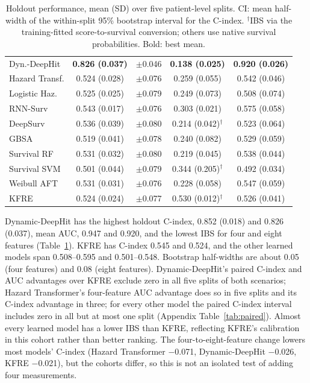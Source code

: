\begin{table}[t]
{\begin{tabular}{@{}lcccc@{}}
Dyn.-DeepHit & \textbf{0.826 (0.037)} & $\pm$0.046 & \textbf{0.138 (0.025)} & \textbf{0.920 (0.026)} \\
Hazard Transf. & 0.524 (0.028) & $\pm$0.076 & 0.259 (0.055) & 0.542 (0.046) \\
Logistic Haz. & 0.525 (0.025) & $\pm$0.079 & 0.249 (0.073) & 0.508 (0.074) \\
RNN-Surv & 0.543 (0.017) & $\pm$0.076 & 0.303 (0.021) & 0.575 (0.058) \\
DeepSurv & 0.536 (0.039) & $\pm$0.080 & 0.214 (0.042)$^{\dagger}$ & 0.523 (0.064) \\
GBSA & 0.519 (0.041) & $\pm$0.078 & 0.240 (0.082) & 0.529 (0.059) \\
Survival RF & 0.531 (0.032) & $\pm$0.080 & 0.219 (0.045) & 0.538 (0.044) \\
Survival SVM & 0.501 (0.044) & $\pm$0.079 & 0.344 (0.205)$^{\dagger}$ & 0.492 (0.034) \\
Weibull AFT & 0.531 (0.031) & $\pm$0.076 & 0.228 (0.058) & 0.547 (0.059) \\
KFRE & 0.524 (0.024) & $\pm$0.077 & 0.530 (0.012)$^{\dagger}$ & 0.526 (0.041) \\
\bottomrule
\end{tabular}%
}
\caption{Holdout performance, mean (SD) over five patient-level splits. CI: mean half-width of the within-split 95\% bootstrap interval for the C-index. $^{\dagger}$IBS via the training-fitted score-to-survival conversion; others use native survival probabilities. Bold: best mean.}
\label{tab:discrimination}
\end{table}

Dynamic-DeepHit has the highest holdout C-index, 0.852 (0.018) and 0.826 (0.037), mean AUC, 0.947 and 0.920, and the lowest IBS for four and eight features (Table~\ref{tab:discrimination}). KFRE has C-index 0.545 and 0.524, and the other learned models span 0.508--0.595 and 0.501--0.548. Bootstrap half-widths are about 0.05 (four features) and 0.08 (eight features). Dynamic-DeepHit's paired C-index and AUC advantages over KFRE exclude zero in all five splits of both scenarios; Hazard Transformer's four-feature AUC advantage does so in five splits and its C-index advantage in three; for every other model the paired C-index interval includes zero in all but at most one split (Appendix Table~\ref{tab:paired}). Almost every learned model has a lower IBS than KFRE, reflecting KFRE's calibration in this cohort rather than better ranking. The four-to-eight-feature change lowers most models' C-index (Hazard Transformer $-$0.071, Dynamic-DeepHit $-$0.026, KFRE $-$0.021), but the cohorts differ, so this is not an isolated test of adding four measurements.

